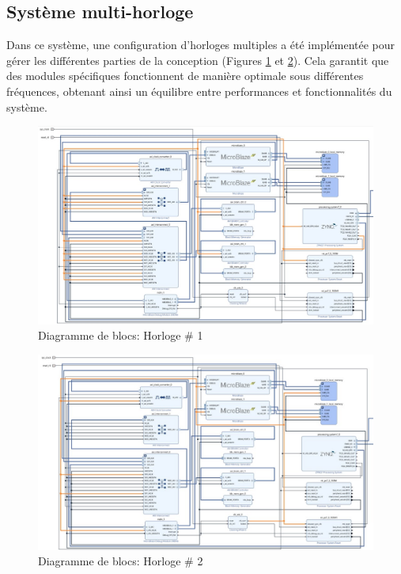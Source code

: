 \documentclass[../CSC_5RO07_TA.tex]{subfiles}
\begin{document}
\subsection{Système multi-horloge}


Dans ce système, une configuration d'horloges multiples a été implémentée pour gérer les différentes parties de la conception (Figures \ref{fig:6} et \ref{fig:7}). Cela garantit que des modules spécifiques fonctionnent de manière optimale sous différentes fréquences, obtenant ainsi un équilibre entre performances et fonctionnalités du système.

\begin{figure}[H]
    \centering
    \includegraphics[width=1.0\columnwidth]{./images/MultiReloj1.jpg}
    \caption{Diagramme de blocs: Horloge \# 1}
    \label{fig:6}
\end{figure}



\begin{figure}[H]
    \centering
    \includegraphics[width=1.0\columnwidth]{./images/MultiReloj2.jpg}
    \caption{Diagramme de blocs: Horloge \# 2}
    \label{fig:7}
\end{figure}
\end{document}
